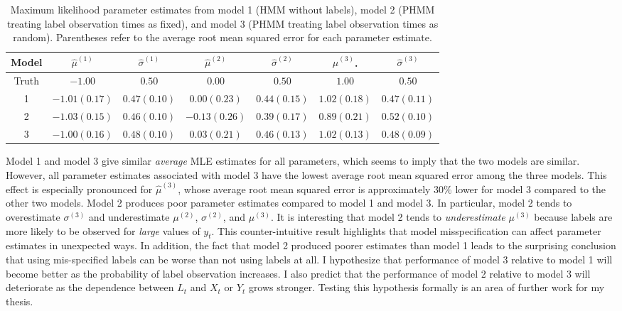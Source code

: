 %
\begin{table}
\centering
\begin{tabular}{c|cc|cc|cc}
Model & $\hat \mu^{(1)}$ & $\hat \sigma^{(1)}$ & $\hat \mu^{(2)}$ & $\hat \sigma^{(2)}$ & $\hat \mu^{(3)}$.       & $\hat \sigma^{(3)}$ \\ \hline
Truth & $-1.00$          & $0.50$              & $0.00$           & $0.50$              & $1.00$                  & $0.50$              \\
1     & $-1.01 (0.17)$   & $0.47 (0.10)$       & $0.00 (0.23)$    & $0.44 (0.15)$       & $1.02 (0.18)$           & $0.47 (0.11)$     \\
2     & $-1.03 (0.15)$   & $0.46 (0.10)$       & $-0.13 (0.26)$   & $0.39 (0.17)$       & $0.89 (0.21)$           & $0.52 (0.10)$     \\
3     & $-1.00 (0.16)$   & $0.48 (0.10)$       & $0.03 (0.21)$    & $0.46 (0.13)$       & $1.02 (\mathbf{0.13})$  & $0.48 (0.09)$
\end{tabular}
\caption{Maximum likelihood parameter estimates from model 1 (HMM without labels), model 2 (PHMM treating label observation times as fixed), and model 3 (PHMM treating label observation times as random). Parentheses refer to the average root mean squared error for each parameter estimate.}
\label{tbl:EDA_PHMM}
\end{table}
%
Model 1 and model 3 give similar \textit{average} MLE estimates for all parameters, which seems to imply that the two models are similar. However, all parameter estimates associated with model 3 have the lowest average root mean squared error among the three models. This effect is especially pronounced for $\hat \mu^{(3)}$, whose average root mean squared error is approximately 30\% lower for model 3 compared to the other two models. 
Model 2 produces poor parameter estimates compared to model 1 and model 3. In particular, model 2 tends to overestimate $\sigma^{(3)}$ and underestimate $\mu^{(2)}$, $\sigma^{(2)}$, and $\mu^{(3)}$. It is interesting that model 2 tends to \textit{underestimate} $\mu^{(3)}$ because labels are more likely to be observed for \textit{large} values of $y_t$. This counter-intuitive result highlights that model misspecification can affect parameter estimates in unexpected ways. In addition, the fact that model 2 produced poorer estimates than model 1 leads to the surprising conclusion that using mis-specified labels can be worse than not using labels at all. I hypothesize that performance of model 3 relative to model 1 will become better as the probability of label observation increases. I also predict that the performance of model 2 relative to model 3 will deteriorate as the dependence between $L_t$ and $X_t$ or $Y_t$ grows stronger. Testing this hypothesis formally is an area of further work for my thesis.